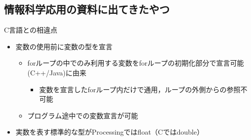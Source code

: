 \documentclass[10pt,unicode]{beamer}
\begin{document}
	\subsection{情報科学応用の資料に出てきたやつ}
	\begin{frame}{C言語との相違点}
		\begin{itemize}
			\item 変数の使用前に変数の型を宣言
			\begin{itemize}
				\item forループの中でのみ利用する変数をforループの初期化部分で宣言可能
				(C++/Java)に由来
				\begin{itemize}
					\item 変数を宣言したforループ内だけで通用，ループの外側からの参照不可能
				\end{itemize}
				\item プログラム途中での変数宣言が可能
			\end{itemize}
			\item 実数を表す標準的な型がProcessingではfloat（Cではdouble）
		\end{itemize}
	\end{frame}
\end{document}
